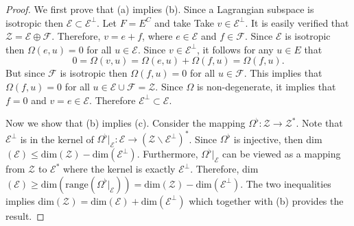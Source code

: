 \begin{proof}
We first prove that (a) implies (b). Since a Lagrangian subspace is isotropic then $\mathcal E \subset \mathcal E^{\perp}$. Let $F = E^C$ and take Take $v \in \mathcal E^{\perp}$. It is easily verified that $\mathcal Z = \mathcal E \oplus\mathcal F$. Therefore, $v = e + f$, where $e \in \mathcal E$ and $f\in \mathcal F$. Since $\mathcal E$ is isotropic then $\Omega(e,u) = 0$ for all $u \in \mathcal E$. Since $v\in \mathcal E^{\perp}$, it follows for any $u\in E$ that
\begin{equation*}
	0 = \Omega(v,u) = \Omega(e,u) + \Omega(f,u) = \Omega(f,u).
\end{equation*}
But since $\mathcal F$ is isotropic then $\Omega(f,u) = 0$ for all $u \in \mathcal F$. This implies that $\Omega(f,u) = 0$ for all $u\in\mathcal E \cup \mathcal F = \mathcal Z$. Since $\Omega$ is non-degenerate, it implies that $f=0$ and $v=e\in \mathcal E$. Therefore $\mathcal E^{\perp} \subset \mathcal E$.

Now we show that (b) implies (c). Consider the mapping $\Omega^{\flat}:\mathcal Z \to \mathcal Z^*$. Note that $\mathcal E^{\perp}$ is in the kernel of $\Omega^{\flat}|_{\mathcal E} : \mathcal E \to (\mathcal Z \backslash \mathcal E^{\perp})^*$. Since $\Omega^{\flat}$ is injective, then dim$(\mathcal E) \leq \text{dim}(\mathcal Z) - \text{dim}(\mathcal E^{\perp})$. Furthermore, $\Omega^{\flat}|_{\mathcal E}$ can be viewed as a mapping from $\mathcal Z$ to $\mathcal E^{*}$ where the kernel is exactly $\mathcal E^{\perp}$. Therefore, dim$(\mathcal E) \geq \text{dim}(\text{range}(\Omega^{\flat}|_{\mathcal E})) = \text{dim}(\mathcal{Z}) - \text{dim}(\mathcal E^{\perp})$. The two inequalities implies dim$(\mathcal Z) = \text{dim}(\mathcal E) + \text{dim}(\mathcal E^{\perp})$ which together with (b) provides the result.


\end{proof}
